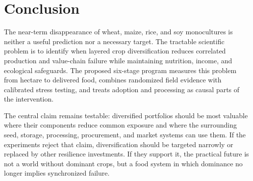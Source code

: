 \documentclass[conference]{IEEEtran}
\begin{document}
\section{Conclusion}
\label{sec:conclusion}
The near-term disappearance of wheat, maize, rice, and soy monocultures is neither a useful prediction nor a necessary target. The tractable scientific problem is to identify when layered crop diversification reduces correlated production and value-chain failure while maintaining nutrition, income, and ecological safeguards. The proposed six-stage program measures this problem from hectare to delivered food, combines randomized field evidence with calibrated stress testing, and treats adoption and processing as causal parts of the intervention.

The central claim remains testable: diversified portfolios should be most valuable where their components reduce common exposure and where the surrounding seed, storage, processing, procurement, and market systems can use them. If the experiments reject that claim, diversification should be targeted narrowly or replaced by other resilience investments. If they support it, the practical future is not a world without dominant crops, but a food system in which dominance no longer implies synchronized failure.
\end{document}
